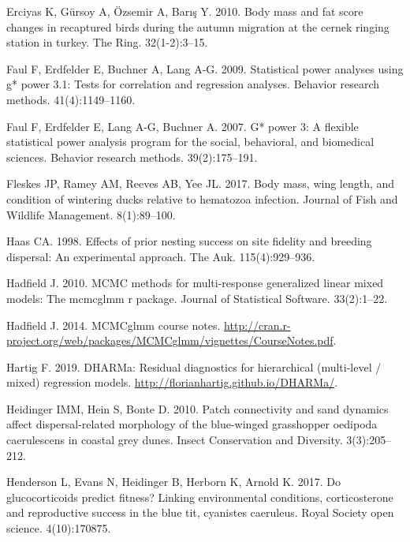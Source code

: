 \documentclass[
]{article}
\begin{document}
\leavevmode\hypertarget{ref-erciyas2010body}{}%
Erciyas K, Gürsoy A, Özsemir A, Barış Y. 2010. Body mass and fat score
changes in recaptured birds during the autumn migration at the cernek
ringing station in turkey. The Ring. 32(1-2):3--15.

\leavevmode\hypertarget{ref-faul2009statistical}{}%
Faul F, Erdfelder E, Buchner A, Lang A-G. 2009. Statistical power
analyses using g* power 3.1: Tests for correlation and regression
analyses. Behavior research methods. 41(4):1149--1160.

\leavevmode\hypertarget{ref-faul2007g}{}%
Faul F, Erdfelder E, Lang A-G, Buchner A. 2007. G* power 3: A flexible
statistical power analysis program for the social, behavioral, and
biomedical sciences. Behavior research methods. 39(2):175--191.

\leavevmode\hypertarget{ref-fleskes2017body}{}%
Fleskes JP, Ramey AM, Reeves AB, Yee JL. 2017. Body mass, wing length,
and condition of wintering ducks relative to hematozoa infection.
Journal of Fish and Wildlife Management. 8(1):89--100.

\leavevmode\hypertarget{ref-haas1998effects}{}%
Haas CA. 1998. Effects of prior nesting success on site fidelity and
breeding dispersal: An experimental approach. The Auk. 115(4):929--936.

\leavevmode\hypertarget{ref-hadfield2010mcmc}{}%
Hadfield J. 2010. MCMC methods for multi-response generalized linear
mixed models: The mcmcglmm r package. Journal of Statistical Software.
33(2):1--22.

\leavevmode\hypertarget{ref-hadfield2014coursenotes}{}%
Hadfield J. 2014. MCMCglmm course notes.
\url{http://cran.r-project.org/web/packages/MCMCglmm/vignettes/CourseNotes.pdf}.

\leavevmode\hypertarget{ref-Hartig2019dharma}{}%
Hartig F. 2019. DHARMa: Residual diagnostics for hierarchical
(multi-level / mixed) regression models.
\url{http://florianhartig.github.io/DHARMa/}.

\leavevmode\hypertarget{ref-heidinger2010patch}{}%
Heidinger IMM, Hein S, Bonte D. 2010. Patch connectivity and sand
dynamics affect dispersal-related morphology of the blue-winged
grasshopper oedipoda caerulescens in coastal grey dunes. Insect
Conservation and Diversity. 3(3):205--212.

\leavevmode\hypertarget{ref-henderson2017glucocorticoids}{}%
Henderson L, Evans N, Heidinger B, Herborn K, Arnold K. 2017. Do
glucocorticoids predict fitness? Linking environmental conditions,
corticosterone and reproductive success in the blue tit, cyanistes
caeruleus. Royal Society open science. 4(10):170875.
\end{document}
